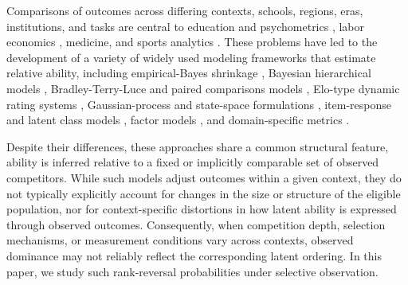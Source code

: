 \documentclass[12pt]{article}
\begin{document}
Comparisons of outcomes across differing contexts, schools, regions, eras, institutions, and tasks are central to education and psychometrics \citep{holland2012differential, bond2013applying}, labor economics \citep{nickell1999labor}, medicine, and sports analytics \citep{BRL99, SM13, SM16, winston2022mathletics, yan2025comparing}. These problems have led to the development of a variety of widely used modeling frameworks that estimate relative ability, including empirical-Bayes shrinkage \citep{efron1975data}, Bayesian hierarchical models \citep{raudenbush1986hierarchical, BRL99}, Bradley-Terry-Luce and paired comparisons models \citep{bradley1952rank, bradley1976science, bradley1984paired, david1988paired}, Elo-type dynamic rating systems \citep{elo1978rating, graepel2007bayesian}, Gaussian-process and state-space formulations \citep{chu2005gaussian, houlsby2012collaborative}, item-response and latent class models \citep{mcdonald1999test, embretson2000item, hagenaars2002applied, holland2012differential, bond2013applying}, factor models \citep{mcdonald1999test, bartholomew2011latent}, and domain-specific metrics \citep{baumer2014statistician, BB15, yu2016pantheon}.

Despite their differences, these approaches share a common structural feature, ability is inferred relative to a fixed or implicitly comparable set of observed competitors. While such models adjust outcomes within a given context, they do not typically explicitly account for changes in the size or structure of the eligible population, nor for context-specific distortions in how latent ability is expressed through observed outcomes. Consequently, when competition depth, selection mechanisms, or measurement conditions vary across contexts, observed dominance may not reliably reflect the corresponding latent ordering. In this paper, we study such rank-reversal probabilities under selective observation.
\end{document}

